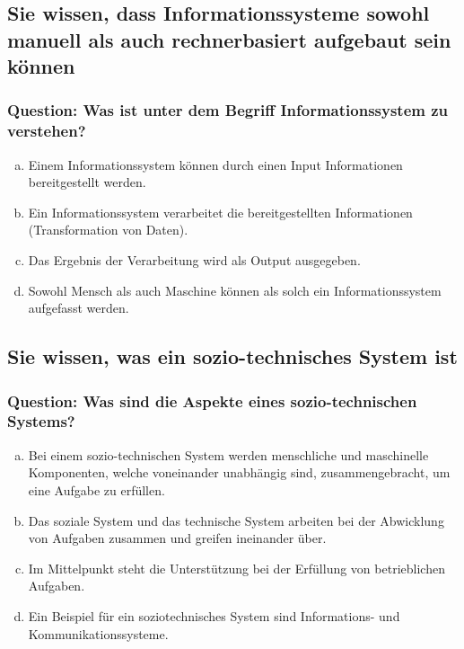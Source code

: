 \documentclass{article}
\begin{document}
\begin{adjustwidth}{2em}{2em}
\begin{adjustwidth}{2em}{2em}
			\subsection{Sie wissen, dass Informationssysteme sowohl manuell als auch rechnerbasiert aufgebaut sein können}
			\begin{adjustwidth}{1em}{}
				\subsubsection*{Question: Was ist unter dem Begriff Informationssystem zu verstehen?}
				\begin{adjustwidth}{1em}{}
					\begin{enumerate}[(a)]
						\item Einem Informationssystem können durch einen Input Informationen bereitgestellt werden.
						\item Ein Informationssystem verarbeitet die bereitgestellten Informationen (Transformation von Daten). 
						\item Das Ergebnis der Verarbeitung wird als Output ausgegeben.
						\item Sowohl Mensch als auch Maschine können als solch ein Informationssystem aufgefasst werden.
					\end{enumerate}
				\end{adjustwidth}
			\end{adjustwidth}
			\subsection{Sie wissen, was ein sozio-technisches System ist}
			\begin{adjustwidth}{1em}{}
				\subsubsection*{Question: Was sind die Aspekte eines sozio-technischen Systems?}
				\begin{adjustwidth}{1em}{}
					\begin{enumerate}[(a)]
						\item Bei einem sozio-technischen System werden menschliche und maschinelle Komponenten, welche voneinander unabhängig sind, zusammengebracht, um eine Aufgabe zu erfüllen.
						\item Das soziale System und das technische System arbeiten bei der Abwicklung von Aufgaben zusammen und greifen ineinander über.
						\item Im Mittelpunkt steht die Unterstützung bei der Erfüllung von betrieblichen Aufgaben.
						\item Ein Beispiel für ein soziotechnisches System sind Informations- und Kommunikationssysteme.
					\end{enumerate}
				\end{adjustwidth}
			\end{adjustwidth}

\end{adjustwidth}
\end{adjustwidth}
\end{document}
